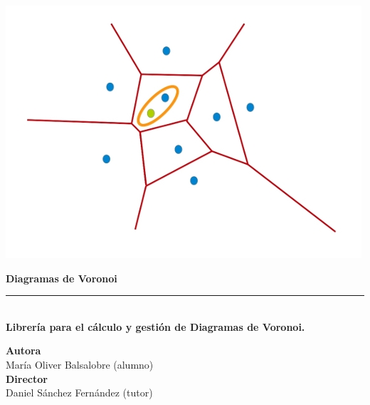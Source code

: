\begin{titlepage}
 
 
\setlength{\centeroffset}{-0.5\oddsidemargin}
\addtolength{\centeroffset}{0.5\evensidemargin}
\thispagestyle{empty}

\noindent\hspace*{\centeroffset}\begin{minipage}{\textwidth}

\centering

% 

 \vspace{2.3cm}

\includegraphics[scale=0.5]{imagenes/logo_voronoi.jpg} 
 \vspace{0.5cm}


{\Huge\bfseries Diagramas de Voronoi\\
}
\noindent\rule[-1ex]{\textwidth}{3pt}\\[3.5ex]
{\large\bfseries Librería para el cálculo y gestión de Diagramas de Voronoi.\\[4cm]}
\end{minipage}

\vspace{2.5cm}
\noindent\hspace*{\centeroffset}\begin{minipage}{\textwidth}
\centering

\textbf{Autora}\\ {María Oliver Balsalobre (alumno)}\\[2.5ex]
\textbf{Director}\\
{Daniel Sánchez Fernández (tutor)}\\[2cm]

\end{minipage}

 
\end{titlepage}


